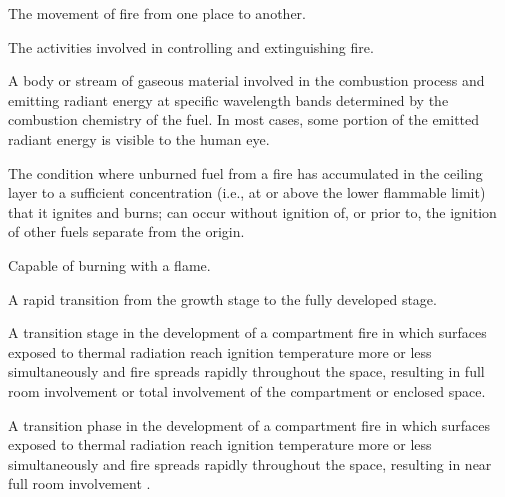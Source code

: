 \begin{description}
\item[Fire Spread] \hfill
\begin{description}[leftmargin=!]
	\item The movement of fire from one place to another.
\end{description}

\item[Fire Suppression] \hfill
\begin{description}[leftmargin=!]
	\item The activities involved in controlling and extinguishing fire.
\end{description}

\item[Flame] \hfill
\begin{description}[leftmargin=!]
	\item A body or stream of gaseous material involved in the combustion process and emitting radiant energy at specific wavelength bands determined by the combustion chemistry of the fuel. In most cases, some portion of the emitted radiant energy is visible to the human eye.
\end{description}

\hypertarget{flameover}{\item[Flameover]} \hfill
\begin{description}[leftmargin=!]
	\item The condition where unburned fuel  from a fire has accumulated in the ceiling layer to a sufficient concentration (i.e., at or above the lower flammable limit) that it ignites and burns; can occur without ignition of, or prior to, the ignition of other fuels separate from the origin.
\end{description}

\item[Flammable] \hfill
\begin{description}[leftmargin=!]
	\item Capable of burning with a flame.
\end{description}

\item[Flashover] \hfill
\begin{description}[leftmargin=!]
	\item A rapid transition from the growth stage to the fully developed stage.
	\item A transition stage in the development of a compartment fire in which surfaces exposed to thermal radiation reach ignition temperature more or less simultaneously and fire spreads rapidly throughout the space, resulting in full room involvement or total involvement of the compartment or enclosed space.
	\item A transition phase in the development of a compartment fire in which surfaces exposed to thermal radiation reach ignition temperature more or less simultaneously and fire spreads rapidly throughout the space, resulting in near full room involvement .
\end{description}


\end{description}
